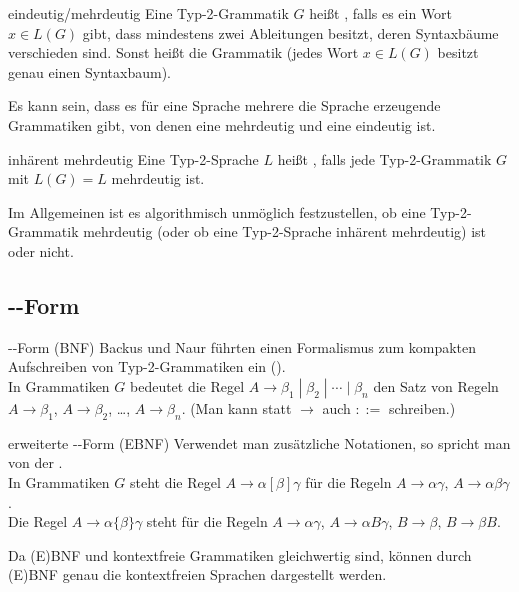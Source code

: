 \linie

\begin{Def}{eindeutig/mehrdeutig}
    Eine Typ-2-Grammatik $G$ heißt , falls es ein Wort\\
    $x \in L(G)$ gibt, dass mindestens zwei Ableitungen besitzt, deren
    Syntaxbäume verschieden sind.
    Sonst heißt die Grammatik 
    (jedes Wort $x \in L(G)$ besitzt genau einen Syntaxbaum).
\end{Def}

\begin{Bem}
    Es kann sein, dass es für eine Sprache mehrere die Sprache erzeugende
    Grammatiken gibt, von denen eine mehrdeutig und eine eindeutig ist.
\end{Bem}

\begin{Def}{inhärent mehrdeutig}
    Eine Typ-2-Sprache $L$ heißt , falls
    jede Typ-2-Grammatik $G$ mit $L(G) = L$ mehrdeutig ist.
\end{Def}

\begin{Bem}
    Im Allgemeinen ist es algorithmisch unmöglich festzustellen, ob eine
    Typ-2-Gram\-matik mehrdeutig
    (oder ob eine Typ-2-Sprache inhärent mehrdeutig) ist oder nicht.
\end{Bem}

\subsection{%
    --Form%
}

\begin{Def}{--Form (BNF)}
    Backus und Naur führten einen Formalismus zum kompakten Aufschreiben
    von Typ-2-Grammatiken ein
    ().\\
    In Grammatiken $G$ bedeutet die Regel
    $A \rightarrow \beta_1 \;|\; \beta_2 \;|\; \dotsb \;|\; \beta_n$
    den Satz von Regeln\\
    $A \rightarrow \beta_1$,
    $A \rightarrow \beta_2$, \dots,
    $A \rightarrow \beta_n$.
    (Man kann statt $\rightarrow$ auch $::=$ schreiben.)
\end{Def}

\begin{Def}{erweiterte --Form (EBNF)}
    Verwendet man zusätzliche Notationen, so spricht man von der
    .\\
    In Grammatiken $G$ steht die Regel $A \rightarrow \alpha [\beta] \gamma$
    für die Regeln $A \rightarrow \alpha \gamma$,
    $A \rightarrow \alpha \beta \gamma$.\\
    Die Regel $A \rightarrow \alpha \{\beta\} \gamma$ steht für die Regeln
    $A \rightarrow \alpha \gamma$, $A \rightarrow \alpha B \gamma$,
    $B \rightarrow \beta$, $B \rightarrow \beta B$.
\end{Def}

\begin{Bem}
    Da (E)BNF und kontextfreie Grammatiken gleichwertig sind, können durch\\
    (E)BNF genau die kontextfreien Sprachen dargestellt werden.
\end{Bem}

\pagebreak
